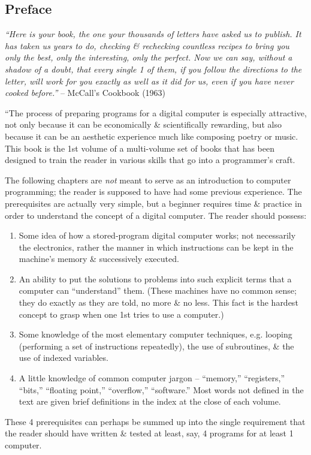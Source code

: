 \documentclass{article}
\begin{document}
\subsection{Preface}
{\it``Here is your book, the one your thousands of letters have asked us to publish. It has taken us years to do, checking \& rechecking countless recipes to bring you only the best, only the interesting, only the perfect. Now we can say, without a shadow of a doubt, that every single 1 of them, if you follow the directions to the letter, will work for you exactly as well as it did for us, even if you have never cooked before.''} -- {\sc McCall}'s Cookbook (1963)

``The process of preparing programs for a digital computer is especially attractive, not only because it can be economically \& scientifically rewarding, but also because it can be an aesthetic experience much like composing poetry or music. This book is the 1st volume of a multi-volume set of books that has been designed to train the reader in various skills that go into a programmer's craft.

The following chapters are {\it not} meant to serve as an introduction to computer programming; the reader is supposed to have had some previous experience. The prerequisites are actually very simple, but a beginner requires time \& practice in order to understand the concept of a digital computer. The reader should
possess:
\begin{enumerate}
	\item Some idea of how a stored-program digital computer works; not necessarily the electronics, rather the manner in which instructions can be kept in the machine's memory \& successively executed.
	\item An ability to put the solutions to problems into such explicit terms that a computer can ``understand'' them. (These machines have no common sense; they do exactly as they are told, no more \& no less. This fact is the hardest concept to grasp when one 1st tries to use a computer.)
	\item Some knowledge of the most elementary computer techniques, e.g. looping (performing a set of instructions repeatedly), the use of subroutines, \& the use of indexed variables.
	\item A little knowledge of common computer jargon -- ``memory,'' ``registers,'' ``bits,'' ``floating point,'' ``overflow,'' ``software.'' Most words not defined in the text are given brief definitions in the index at the close of each volume.
\end{enumerate}
These 4 prerequisites can perhaps be summed up into the single requirement that the reader should have written \& tested at least, say, 4 programs for at least 1 computer.
\end{document}
